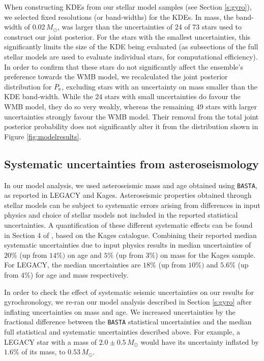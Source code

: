 \documentclass[12pt]{article}
\begin{document}
When constructing KDEs from our stellar model samples (see Section \ref{s:gyro}), we selected fixed resolutions (or band-widths) for the KDEs. In mass, the band-width of $0.02\, M_\odot$, was larger than the uncertainties of 24 of 73 stars used to construct our joint posterior. For the stars with the smallest uncertainties, this significantly limits the size of the KDE being evaluated (as subsections of the full stellar models are used to evaluate individual stars, for computational efficiency). In order to confirm that these stars do not significantly affect the ensemble's preference towards the WMB model, we recalculated the joint posterior distribution for $P_{\rm s}$, excluding stars with an uncertainty on mass smaller than the KDE band-width. While the 24 stars with small uncertainties do favour the WMB model, they do so very weakly, whereas the remaining 49 stars with larger uncertainties strongly favour the WMB model. Their removal from the total joint posterior probability does not significantly alter it from the distribution shown in Figure \ref{fig:modelresults}.

\subsection{Systematic uncertainties from asteroseismology}
In our model analysis, we used asteroseismic mass and age obtained using \texttt{BASTA}, as reported in LEGACY and Kages. Asteroseismic properties obtained through stellar models can be subject to systematic errors arising from differences in input physics and choice of stellar models not included in the reported statistical uncertainties. A quantification of these different systematic effects can be found in Section 4 of \cite{silvaaguirre+2015}, based on the Kages catalogue. Combining their reported median systematic uncertainties due to input physics results in median uncertainties of $20\%$ (up from $14\%)$ on age and $5\%$ (up from $3\%$) on mass for the Kages sample. For LEGACY, the median uncertainties are $18\%$ (up from $10\%)$ and $5.6\%$ (up from $4\%$) for age and mass respectively.

In order to check the effect of systematic seismic uncertainties on our results for gyrochronology, we re-ran our model analysis described in Section \ref{s:gyro} after inflating uncertainties on mass and age. We increased uncertainties by the fractional difference between the \texttt{BASTA} statistical uncertainties and the median full statistical and systematic uncertainties described above. For example, a LEGACY star with a mass of $2.0 \pm 0.5\, M_\odot$ would have its uncertainty inflated by $1.6\%$ of its mass, to $0.53\, M_\odot$.
\end{document}
